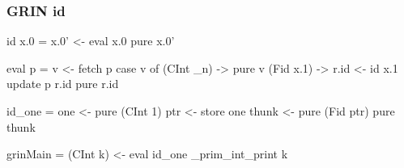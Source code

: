 \documentclass[bigger,aspectratio=169]{beamer}
\begin{document}
\begin{frame}[fragile]
\frametitle{GRIN id}

\begin{center}

	\vspace{0.5cm}
	\begin{minipage}{0.40\textwidth}
		\begin{haskellcode}
			id x.0 =
			 x.0' <- eval x.0
			 pure x.0'
		\end{haskellcode}
		\vfill
		\pause
		\begin{haskellcode}
			eval p =
			 v <- fetch p
			 case v of
			  (CInt _n) -> pure v
			  (Fid x.1) ->
			   r.id <- id x.1
			   update p r.id
			   pure r.id
		\end{haskellcode}
	\end{minipage}
	\hfill
	\pause
	\begin{minipage}{0.50\textwidth}
		\begin{haskellcode}
			id_one =
			 one   <- pure (CInt 1)
			 ptr   <- store one
			 thunk <- pure (Fid ptr)
			 pure thunk
		\end{haskellcode}
		\vspace{1.55cm}
		\pause
		\begin{haskellcode}
			grinMain =
			 (CInt k) <- eval id_one
			 _prim_int_print k
		\end{haskellcode}
	\end{minipage}

\end{center}
\end{frame}
\end{document}
